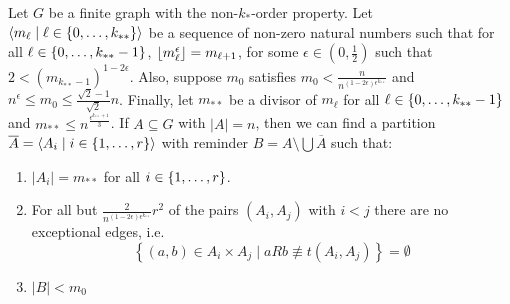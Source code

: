     \lemma[Claim 4.14]\label{existance_of_equitative_partition_with_bound_exceptional_pairs}
        Let $G$ be a finite graph with the non-$k_{*}$-order property.
        Let $\left< m_\ell \mid \ell \in \left\{ 0, \dots, k_{**} \right\} \right>$ be a sequence of non-zero natural numbers such that
        for all $\ell \in \left\{ 0, \dots, k_{**}-1 \right\}$, $\left\lfloor m_\ell^\epsilon \right\rfloor = m_{\ell+1}$,
        for some $\epsilon \in (0, \frac{1}{2})$ such that $2 < (m_{k_{**}-1})^{1-2\epsilon}$.
        Also, suppose $m_0$ satisfies $m_0 < \frac{n}{n^{(1 - 2\epsilon)\epsilon^{k_{**}}}}$ and
        $n^\epsilon \leq m_0 \leq \frac{\sqrt{2}-1}{\sqrt{2}} n$.
        Finally, let $m_{**}$ be a divisor of $m_\ell$ for all $\ell \in \left\{ 0, \dots, k_{**}-1 \right\}$ and
        $m_{**} \leq n^{\frac{\epsilon^{k_{**}+1}}{3}}$.
        If $A \subseteq G$ with $|A| = n$, then we can find a partition $\overline{A} = \left< A_i \mid i \in \left\{ 1, \dots, r \right\} \right>$
        with reminder $B = A \setminus \bigcup \overline{A}$ such that:
        \begin{enumerate}
            \item\label{itm:4.14.1} $|A_i| = m_{**}$ for all $i \in \left\{ 1, \dots, r \right\}$.
            \item\label{itm:4.14.2} For all but $\frac{2}{n^{(1-2\epsilon)\epsilon^{k_{**}}}}r^2$ of the pairs
                $(A_i, A_j)$ with $i<j$ there are no exceptional edges, i.e.
                \[
                    \left\{ (a,b) \in A_i \times A_j \mid a R b \not\equiv t(A_i, A_j) \right\} = \emptyset
                \]
            \item\label{itm:4.14.3} $|B| < m_0$
        \end{enumerate}
